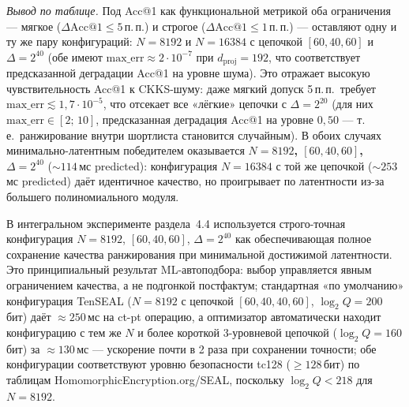 \documentclass[a4paper, 12pt, oneside, openany]{article}
\begin{document}
\emph{Вывод по таблице.} Под Acc@1 как функциональной метрикой оба ограничения --- мягкое ($\Delta\mathrm{Acc@1} \leq 5$\,п.\,п.) и строгое ($\Delta\mathrm{Acc@1} \leq 1$\,п.\,п.) --- оставляют одну и ту же пару конфигураций: $N = 8192$ и $N = 16384$ с цепочкой $[60,40,60]$ и $\Delta = 2^{40}$ (обе имеют $\mathrm{max\_err} \approx 2 \cdot 10^{-7}$ при $d_{\mathrm{proj}} = 192$, что соответствует пред\-ска\-зан\-ной деградации Acc@1 на уровне шума). Это отражает высокую чувствительность Acc@1 к CKKS-шуму: даже мягкий допуск 5\,п.\,п.\ требует $\mathrm{max\_err} \lesssim 1{,}7 \cdot 10^{-5}$, что отсекает все «лёгкие» цепочки с $\Delta = 2^{20}$ (для них $\mathrm{max\_err} \in [2;\,10]$, предсказанная деградация Acc@1 на уровне $0{,}50$ --- т.\,е.\ ранжирование внутри шортлиста становится случайным). В обоих случаях минимально-латентным победителем оказывается \textbf{$N = 8192$, $[60,40,60]$, $\Delta = 2^{40}$} ($\sim 114$\,мс predicted): конфигурация $N = 16384$ с той же цепочкой ($\sim 253$\,мс predicted) даёт идентичное качество, но проигрывает по латентности из-за большего полиномиального модуля.

В интегральном эксперименте раздела~4.4 используется строго-точная конфигурация $N = 8192$, $[60, 40, 60]$, $\Delta = 2^{40}$ как обеспечивающая полное сохранение качества ранжирования при минимальной достижимой латентности. Это принципиальный результат ML-автоподбора: выбор управляется явным ограничением качества, а не подгонкой постфактум; стандартная «по умолчанию» конфигурация TenSEAL ($N = 8192$ с цепочкой $[60, 40, 40, 60]$, $\log_{2} Q = 200$ бит) даёт $\approx 250$\,мс на ct-pt операцию, а оптимизатор автоматически находит конфигурацию с тем же $N$ и более короткой 3-уровневой цепочкой ($\log_{2} Q = 160$\,бит) за $\approx 130$\,мс --- ускорение почти в 2 раза при сохранении точности; обе конфигурации соответствуют уровню безопасности tc128 ($\geq 128$\,бит) по таблицам HomomorphicEncryption.org/SEAL, поскольку $\log_{2} Q < 218$ для $N = 8192$.
\end{document}
